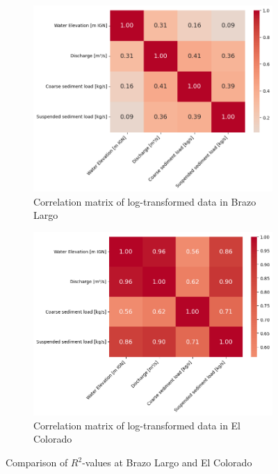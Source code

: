 \begin{figure}[h!]
    \centering
    \begin{subfigure}[b]{0.48\linewidth}
        \centering        \includegraphics[width=\linewidth]{figures/ch5/logcorrelations Brazo Largo.png}
        \caption{Correlation matrix of log-transformed data in Brazo Largo}
        \label{fig:logcorrelation brazo}
    \end{subfigure}
    \hfill
    \begin{subfigure}[b]{0.48\linewidth}
        \centering
        \includegraphics[width=\linewidth]{figures/ch5/logcorrelations Bermejo.png}
        \caption{Correlation matrix of log-transformed data in El Colorado}
        \label{fig:logcorrelation bermejo}
    \end{subfigure}
    
    \caption{Comparison of $R^2$-values at Brazo Largo and El Colorado}
    \label{fig:correlationmatrices}
\end{figure}

